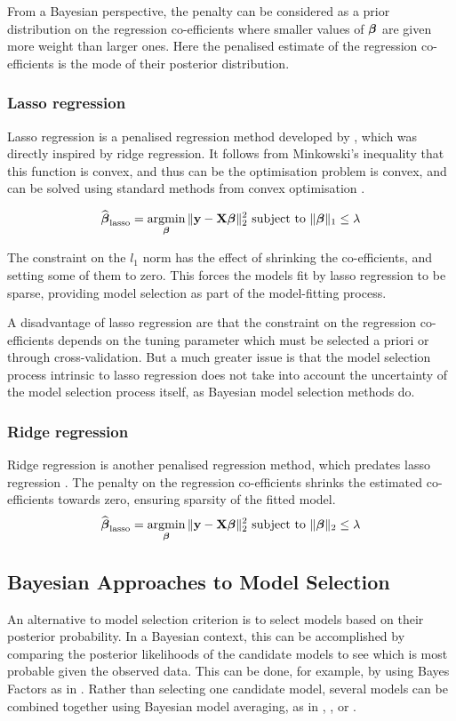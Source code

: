 From a Bayesian perspective, the penalty can be considered as a prior distribution on the regression 
co-efficients where smaller values of ${\boldsymbol \beta}$ are given more weight than larger ones. Here the penalised
estimate of the regression co-efficients is the mode of their posterior distribution.
\subsubsection{Lasso regression}
Lasso regression is a penalised regression method developed by \citep{Tibshirani1996}, which was directly
inspired by ridge regression.
It follows from Minkowski's inequality that this function is convex, and thus can be the optimisation problem
is convex, and can be solved using standard methods from convex optimisation \citep{Boyd2010}.

$$
\widehat{\vbeta}_{\text{lasso}} = \argmin_\vbeta \|\vy - \mX \vbeta\|_2^2 \text{ subject to } \|\vbeta\|_1 \leq \lambda
$$

The constraint on the $l_1$ norm has the effect of shrinking the co-efficients, and setting some of them to
zero. This forces the models fit by lasso regression to be sparse, providing model selection as part of the
model-fitting process.

A disadvantage of lasso regression are that the constraint on the regression co-efficients depends on the
tuning parameter which must be selected a priori or through cross-validation. But a much greater issue is that
the model selection process intrinsic to lasso regression does not take into account the uncertainty of the
model selection process itself, as Bayesian model selection methods do.

\subsubsection{Ridge regression}
Ridge regression is another penalised regression method, which predates lasso regression
\cite{Hoerl1970}. The penalty on the regression co-efficients shrinks the estimated co-efficients towards
zero, ensuring sparsity of the fitted model.
$$
\widehat{\vbeta}_{\text{lasso}} = \argmin_\vbeta \|\vy - \mX \vbeta\|_2^2 \text{ subject to } \|\vbeta\|_2 \leq \lambda
$$

\subsection{Bayesian Approaches to Model Selection}
An alternative to model selection criterion is to select models based on their posterior probability. In a
Bayesian context, this can be accomplished by comparing the posterior likelihoods of the candidate models to
see which is most probable given the observed data. This can be done, for example, by using Bayes Factors as
in \cite{Kass1993}. Rather than selecting one candidate model, several models can be combined together using
Bayesian model averaging, as in \cite{Hoeting1999}, \cite{Raftery1997}, \cite{Fernandez2001} or
\cite{Papaspiliopoulos2016}.

